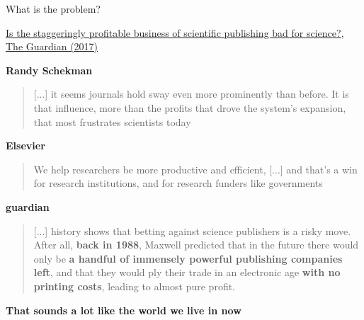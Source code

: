\documentclass[10pt,compress,serif,aspectratio=169]{beamer}
\begin{document}
\begin{frame}[t]{What is the problem?}

\href{https://www.theguardian.com/science/2017/jun/27/profitable-business-scientific-publishing-bad-for-science}{Is the staggeringly profitable business of scientific publishing bad for science?, The Guardian (2017)}


\vfill
\textbf{Randy Schekman}
\begin{quote}
  [...] it seems journals hold sway even more prominently than before. It is that influence, more than the profits that drove the system’s expansion, that most frustrates scientists today
\end{quote}

\textbf{Elsevier}
\begin{quote}
  We help researchers be more productive and efficient, [...] %
  and that’s a win for research institutions, and for research funders like governments
\end{quote}


\textbf{guardian}
\begin{quote}
[...] history shows that betting against science publishers is a risky move. After all, \textbf{back in 1988}, Maxwell predicted that in the future there would only be \textbf{a handful of immensely powerful publishing companies left}, and that they would ply their trade in an electronic age \textbf{with no printing costs}, leading to almost pure profit. 
\end{quote}
\begin{center}
  \textbf{That sounds a lot like the world we live in now}
\end{center}
\end{frame}
\end{document}
